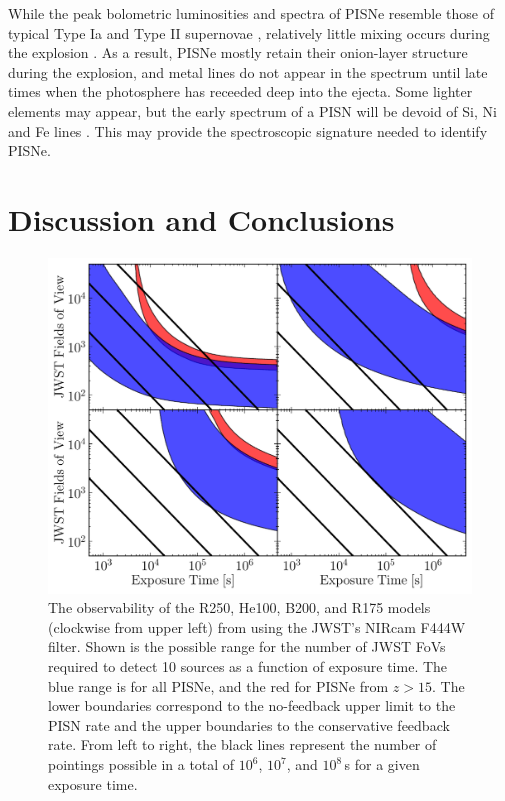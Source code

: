 \documentclass{thesis}
\begin{document}
While the peak bolometric luminosities and spectra of PISNe resemble
those of typical Type Ia and Type II supernovae
\citep{JoggerstWhalen2011, KasenWoosleyHeger2011}, relatively little
mixing occurs during the explosion \citep{JoggerstWhalen2011,
  ChenHegerAlmgren2011}.  As a result, PISNe mostly retain their
onion-layer structure during the explosion, and metal lines do not
appear in the spectrum until late times when the photosphere has
receeded deep into the ejecta.  Some lighter elements may appear, but
the early spectrum of a PISN will be devoid of Si, Ni and Fe lines
\citep{JoggerstWhalen2011}. This may provide the spectroscopic
signature needed to identify PISNe.

\section{Discussion and Conclusions}
\label{conclusions} 
\begin{figure}[t!]
\begin{center}
  \includegraphics[width=15cm]{observability}
  \caption{\footnotesize The observability of the R250, He100, B200,
    and R175 models (clockwise from upper left) from
    \citet{KasenWoosleyHeger2011} using the JWST's NIRcam F444W
    filter. Shown is the possible range for the number of JWST FoVs
    required to detect 10 sources as a function of exposure time. The
    blue range is for all PISNe, and the red for PISNe
    from $z>15$.  The lower boundaries correspond to the
    no-feedback upper limit to the PISN rate and the upper boundaries to
    the conservative feedback rate.  From left to right, the black
    lines represent the number of pointings possible in a total of
    $10^6$, $10^7$, and $10^8\,$s for a given exposure time.}
  \label{observability}
\end{center}
\end{figure}
\end{document}
